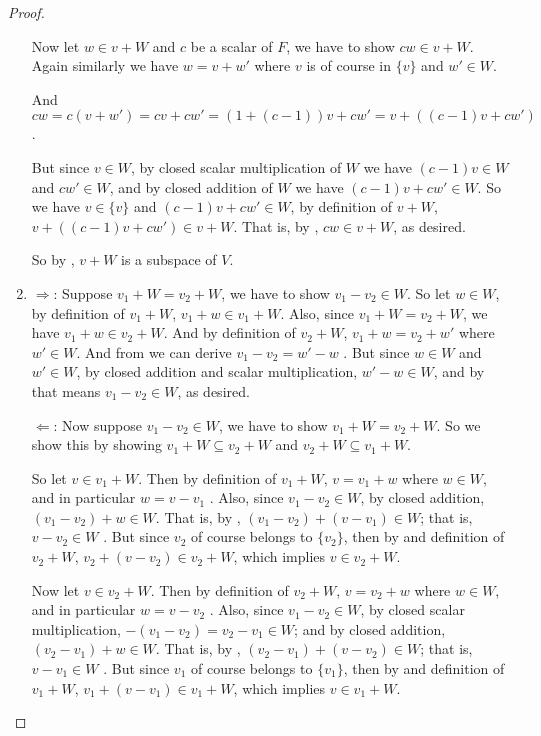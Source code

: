 \begin{proof}
\begin{enumerate}
Now let \(w \in v + W\) and \(c\) be a scalar of \(F\), we have to show \(cw \in v + W\).
Again similarly we have \(w = v + w'\) where \(v\) is of course in \(\{ v \}\) and \(w' \in W\).

And \(c w = c (v + w') = cv + cw' = (1 + (c - 1))v + cw' = v + ((c - 1)v + cw')\) .

But since \(v \in W\), by closed scalar multiplication of \(W\) we have \((c - 1)v \in W\) and \(cw' \in W\), and by closed addition of \(W\) we have \((c - 1)v + cw' \in W\).
So we have \(v \in \{ v \}\) and \((c - 1)v + cw' \in W\), by definition of \(v + W\), \(v + ((c - 1)v + cw') \in v + W\).
That is, by , \(cw \in v + W\), as desired.

So by , \(v + W\) is a subspace of \(V\).

\item
\(\Longrightarrow\): Suppose \(v_1 + W = v_2 + W\), we have to show \(v_1 - v_2 \in W\).
So let \(w \in W\), by definition of \(v_1 + W\), \(v_1 + w \in v_1 + W\).
Also, since \(v_1 + W = v_2 + W\), we have \(v_1 + w \in v_2 + W\).
And by definition of \(v_2 + W\), \(v_1 + w = v_2 + w'\)  where \(w' \in W\).
And from  we can derive \(v_1 - v_2 = w' - w\) .
But since \(w \in W\) and \(w' \in W\), by closed addition and scalar multiplication, \(w' - w \in W\), and by  that means \(v_1 - v_2 \in W\), as desired.

\(\Longleftarrow\): Now suppose \(v_1 - v_2 \in W\), we have to show \(v_1 + W = v_2 + W\).
So we show this by showing \(v_1 + W \subseteq v_2 + W\) and \(v_2 + W \subseteq v_1 + W\).

So let \(v \in v_1 + W\).
Then by definition of \(v_1 + W\), \(v = v_1 + w\) where \(w \in W\), and in particular \(w = v - v_1\) .
Also, since \(v_1 - v_2 \in W\), by closed addition, \((v_1 - v_2) + w \in W\).
That is, by , \((v_1 - v_2) + (v - v_1) \in W\);
that is, \(v - v_2 \in W\) .
But since \(v_2\) of course belongs to \(\{ v_2 \}\), then by  and definition of \(v_2 + W\), \(v_2 + (v - v_2) \in v_2 + W\), which implies \(v \in v_2 + W\).

Now let \(v \in v_2 + W\).
Then by definition of \(v_2 + W\), \(v = v_2 + w\) where \(w \in W\), and in particular \(w = v - v_2\) .
Also, since \(v_1 - v_2 \in W\), by closed scalar multiplication, \(-(v_1 - v_2) = v_2 - v_1 \in W\);
and by closed addition, \((v_2 - v_1) + w \in W\).
That is, by , \((v_2 - v_1) + (v - v_2) \in W\);
that is, \(v - v_1 \in W\) .
But since \(v_1\) of course belongs to \(\{ v_1 \}\), then by  and definition of \(v_1 + W\), \(v_1 + (v - v_1) \in v_1 + W\), which implies \(v \in v_1 + W\).


\end{enumerate}
\end{proof}
